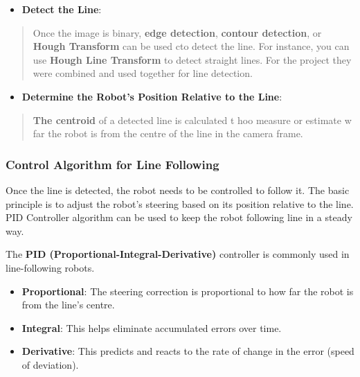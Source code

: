\documentclass[../../main]{subfiles}
\begin{document}
    \begin{itemize}
    \item
      \textbf{Detect the Line}:
    \end{itemize}
    
    \begin{quote}
    Once the image is binary, \textbf{edge detection}, \textbf{contour
    detection}, or \textbf{Hough Transform} can be used cto detect the line.
    For instance, you can use \textbf{Hough Line Transform} to detect
    straight lines. For the project they were combined and used together for
    line detection.
    \end{quote}
    
    \begin{itemize}
    \item
      \textbf{Determine the Robot's Position Relative to the Line}:
    \end{itemize}
    
    \begin{quote}
    \textbf{The centroid} of a detected line is calculated t hoo measure or
    estimate w far the robot is from the centre of the line in the camera
    frame.
    \end{quote}
    
    \subsubsection{Control Algorithm for Line Following}
    
    Once the line is detected, the robot needs to be controlled to follow
    it. The basic principle is to adjust the robot's steering based on its
    position relative to the line. PID Controller algorithm can be used to
    keep the robot following line in a steady way.
    
    The \textbf{PID (Proportional-Integral-Derivative)} controller is
    commonly used in line-following robots.
    
    \begin{itemize}
    \item
      \textbf{Proportional}: The steering correction is proportional to how
      far the robot is from the line's centre.
    \item
      \textbf{Integral}: This helps eliminate accumulated errors over time.
    \item
      \textbf{Derivative}: This predicts and reacts to the rate of change in
      the error (speed of deviation).
    \end{itemize}
    
\end{document}
